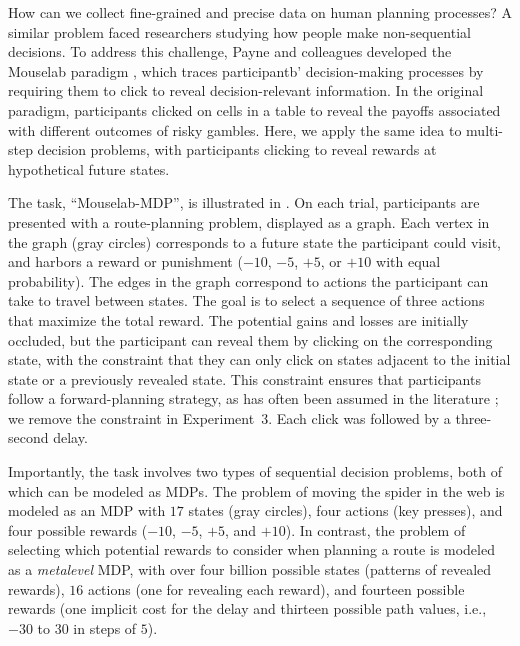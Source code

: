 How can we collect fine-grained and precise data on human planning processes? A similar problem faced researchers studying how people make non-sequential decisions. To address this challenge, Payne and colleagues developed the Mouselab paradigm \citep{payne1976task,payne1988adaptive}, which traces participantb' decision-making processes by requiring them to click to reveal decision-relevant information. In the original paradigm, participants clicked on cells in a table to reveal the payoffs associated with different outcomes of risky gambles. Here, we apply the same idea to multi-step decision problems, with participants clicking to reveal rewards at hypothetical future states.


The task, ``Mouselab-MDP'', is illustrated in . On each trial, participants are presented with a route-planning problem, displayed as a graph. Each vertex in the graph (gray circles) corresponds to a future state the participant could visit, and harbors a reward or punishment ($-10$, $-5$, $+5$, or $+10$ with equal probability). The edges in the graph correspond to actions the participant can take to travel between states. The goal is to select a sequence of three actions that maximize the total reward. The potential gains and losses are initially occluded, but the participant can reveal them by clicking on the corresponding state, with the constraint that they can only click on states adjacent to the initial state or a previously revealed state. This constraint ensures that participants follow a forward-planning strategy, as has often been assumed in the literature \citep{huys2015interplay,huys2012bonsai,vanopheusden2017computational,macgregor2001information,keramati2016adaptive,krusche2018adaptive,snider2015prospective}; we remove the constraint in Experiment~3. Each click was followed by a three-second delay.

Importantly, the task involves two types of sequential decision problems, both of which can be modeled as MDPs. The problem of moving the spider in the web is modeled as an MDP with $17$ states (gray circles), four actions (key presses), and four possible rewards ($-10$, $-5$, $+5$, and $+10$). In contrast, the problem of selecting which potential rewards to consider when planning a route is modeled as a \emph{metalevel} MDP, with over four billion possible states (patterns of revealed rewards), $16$ actions (one for revealing each reward), and fourteen possible rewards (one implicit cost for the delay and thirteen possible path values, i.e., $-30$ to $30$ in steps of $5$).


